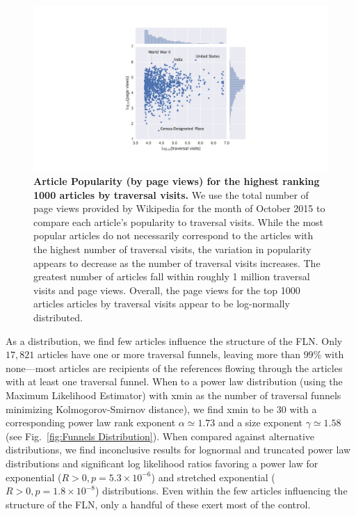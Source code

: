 \documentclass[pre,twocolumn,twoside,superscriptaddress,floatfix]{revtex4-1}
\begin{document}
{\begin{figure}[tp!]
  \includegraphics[width=\columnwidth]{popularity_visits.pdf}
  \caption{
\textbf{Article Popularity (by page views) for the highest ranking 1000 articles by traversal visits.}
We use the total number of page views provided by Wikipedia for the month
of October 2015 to compare each article's popularity to traversal visits.
While the most popular articles do not necessarily correspond to the articles
with the highest number of traversal visits, the variation in popularity appears to decrease as the number of traversal visits increases. The greatest number of articles fall within roughly 1 million traversal visits and page views. Overall, the page views for the top 1000 articles articles by traversal visits appear to be log-normally distributed. 
}
  \label{fig:Views and Visits}

\end{figure}
As a distribution, we find few articles influence the structure of the 
FLN. Only $17, 821$ articles have one or more traversal funnels, leaving
more than $99\%$ with none---most articles are recipients of 
the references flowing through the articles with at least one traversal funnel.
When to a power law 
    distribution (using the Maximum Likelihood Estimator) with xmin as the number of traversal funnels minimizing Kolmogorov-Smirnov distance), we find xmin to be 30 with a corresponding power law rank exponent $\alpha \simeq 1.73$ and a size exponent $\gamma \simeq 1.58$
(see Fig.~\ref{fig:Funnels Distribution}). 
When compared against alternative distributions, we find inconclusive results for lognormal and truncated power law distributions and significant log likelihood ratios favoring a power law for exponential ($R>0, p=5.3\times10^{-6}$) and stretched exponential ($R>0, p = 1.8\times10^{-8}$) distributions.
Even within the few articles
influencing the structure of the FLN, only a handful of these exert most of the 
control. 

}
\end{document}
